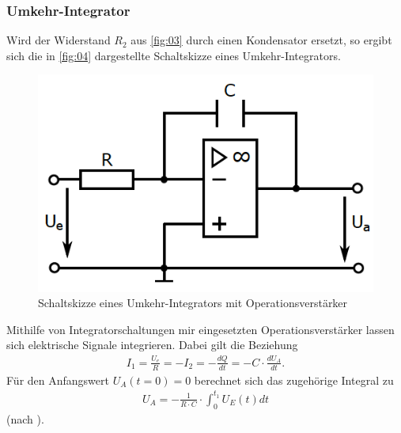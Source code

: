 \subsubsection{Umkehr-Integrator}
\noindent Wird der Widerstand $R_2$ aus \autoref{fig:03} durch einen
Kondensator ersetzt, so ergibt sich die in \autoref{fig:04} dargestellte
Schaltskizze eines Umkehr-Integrators.
\begin{figure}
  \centering
  \includegraphics{ressources/figure_04.png}
  \caption{Schaltskizze eines Umkehr-Integrators mit Operationsverstärker \cite{sample}}
  \label{fig:04}
\end{figure}
\noindent Mithilfe von Integratorschaltungen mir eingesetzten
Operationsverstärker lassen sich elektrische Signale integrieren. Dabei gilt die
Beziehung
\begin{align}
  I_1 = \frac{U_e}{R} = - I_2 = - \frac{dQ}{dt} = - C \cdot \frac{d U_A}{dt}.
  \label{eqn:06}
\end{align}
\noindent Für den Anfangswert $U_A(t=0) = 0$ berechnet sich das zugehörige
Integral zu
\begin{align}
  U_A = - \frac{1}{R \cdot C} \cdot \int_0^{t_1} U_E(t) dt
  \label{eqn:07}
\end{align}
\noindent (nach \cite{muenster}).
